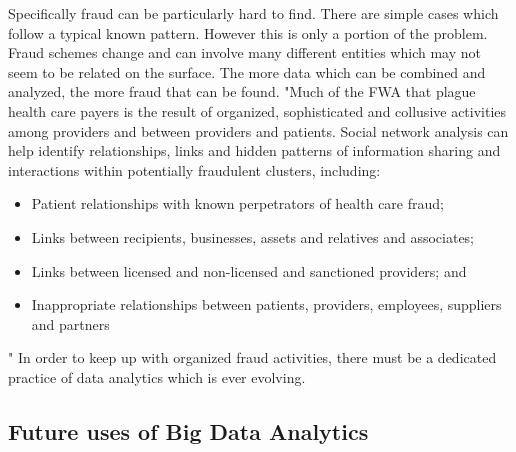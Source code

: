\documentclass[sigconf]{acmart}
\begin{document}
Specifically fraud can be particularly hard to find.  There are simple cases which follow a typical known pattern.  However this is only a portion of the problem.  Fraud schemes change and can involve many different entities which may not seem to be related on the surface.  The more data which can be combined and analyzed, the more fraud that can be found.  "Much of the FWA that plague health care payers is the result of organized, sophisticated and collusive activities among providers and between providers and patients. Social network analysis can help identify relationships, links and hidden patterns of information sharing and interactions within potentially fraudulent clusters, including:
\begin{itemize}
  \item Patient relationships with known perpetrators of health care fraud;
  \item Links between recipients, businesses, assets and relatives and associates;
  \item Links between licensed and non-licensed and sanctioned providers; and
  \item Inappropriate relationships between patients, providers, employees, suppliers and partners
\end{itemize}"\cite{LexisNexis}
In order to keep up with organized fraud activities, there must be a dedicated practice of data analytics which is ever evolving. 


\subsection{Future uses of Big Data Analytics}
\end{document}
